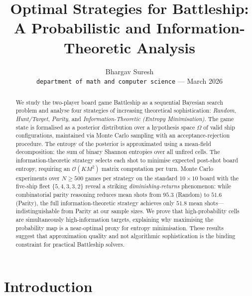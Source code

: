 \documentclass[12pt,a4paper]{article}
\title{%
  \textbf{Optimal Strategies for Battleship:}\\[4pt]
  \large A Probabilistic and Information-Theoretic Analysis%
}
\author{%
  Bhargav Suresh\\[4pt]
  \small \texttt{department of math and computer science} — March 2026%
}
\date{}
\newcommand{\1}{\mathbf{1}}
\newcommand{\bigo}{\mathcal{O}}
\begin{document}

\maketitle
\thispagestyle{empty}

\begin{abstract}
We study the two-player board game Battleship as a sequential Bayesian search
problem and analyse four strategies of increasing theoretical sophistication:
\emph{Random}, \emph{Hunt/Target}, \emph{Parity}, and \emph{Information-Theoretic
(Entropy Minimisation)}.  The game state is formalised as a posterior distribution
over a hypothesis space $\Omega$ of valid ship configurations, maintained via
Monte Carlo sampling with an acceptance-rejection procedure.  The entropy of the
posterior is approximated using a mean-field decomposition: the sum of binary
Shannon entropies over all unfired cells.  The information-theoretic strategy
selects each shot to minimise expected post-shot board entropy, requiring an
$\bigo(K M^2)$ matrix computation per turn.  Monte Carlo experiments over
$N \geq 500$ games per strategy on the standard $10 \times 10$ board with the
five-ship fleet $\{5,4,3,3,2\}$ reveal a striking \emph{diminishing-returns}
phenomenon: while combinatorial parity reasoning reduces mean shots from
$95.3$ (Random) to $51.6$ (Parity), the full information-theoretic strategy
achieves only $51.8$ mean shots---indistinguishable from Parity at our sample
sizes.  We prove that high-probability cells are simultaneously high-information
targets, explaining why maximising the probability map is a near-optimal proxy
for entropy minimisation.  These results suggest that approximation quality and
not algorithmic sophistication is the binding constraint for practical Battleship
solvers.
\end{abstract}

\newpage
\tableofcontents
\newpage

\section{Introduction}
\end{document}
